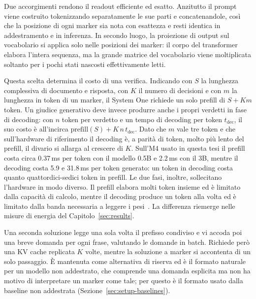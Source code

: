 Due accorgimenti rendono il readout efficiente ed esatto. Anzitutto il prompt viene costruito tokenizzando
separatamente le sue parti e concatenandole, così che la posizione di ogni marker sia nota con esattezza e resti
identica in addestramento e in inferenza. In secondo luogo, la proiezione di output sul vocabolario si applica solo
nelle posizioni dei marker: il corpo del transformer elabora l'intera sequenza, ma la grande matrice del vocabolario
viene moltiplicata soltanto per i pochi stati nascosti effettivamente letti.

Questa scelta determina il costo di una verifica. Indicando con $S$ la lunghezza complessiva di documento e risposta,
con $K$ il numero di decisioni e con $m$ la lunghezza in token di un marker, il System One richiede un solo prefill di
$S + K m$ token. Un giudice generativo deve invece produrre anche i propri verdetti in fase di decoding: con $n$ token
per verdetto e un tempo di decoding per token $t_\mathrm{dec}$, il suo costo è all'incirca
$\mathrm{prefill}(S) + K\, n\, t_\mathrm{dec}$. Dato che $m$ vale tre token e che sull'hardware di riferimento il
decoding è, a parità di token, molto più lento del prefill, il divario si allarga al crescere di $K$. Sull'M4 usato in
questa tesi il prefill costa circa 0.37\,ms per token con il modello 0.5B e 2.2\,ms con il 3B, mentre il decoding costa
5.9 e 31.8\,ms per token generato: un token in decoding costa quanto quattordici-sedici token in prefill. Le due fasi,
inoltre, sollecitano l'hardware in modo diverso. Il prefill elabora molti token insieme ed è limitato dalla capacità di
calcolo, mentre il decoding produce un token alla volta ed è limitato dalla banda necessaria a leggere i
pesi~\cite{pope2023scaling,patel2024splitwise}. La differenza riemerge nelle misure di energia del
Capitolo~\ref{sec:results}.

Una seconda soluzione legge una sola volta il prefisso condiviso e vi accoda poi una breve domanda per ogni frase,
valutando le domande in batch. Richiede però una KV cache replicata $K$ volte, mentre la soluzione a marker si
accontenta di un solo passaggio. È mantenuta come alternativa di riserva ed è il formato naturale per un modello non
addestrato, che comprende una domanda esplicita ma non ha motivo di interpretare un marker come tale; per questo è il
formato usato dalla baseline non addestrata (Sezione~\ref{sec:setup-baselines}).

